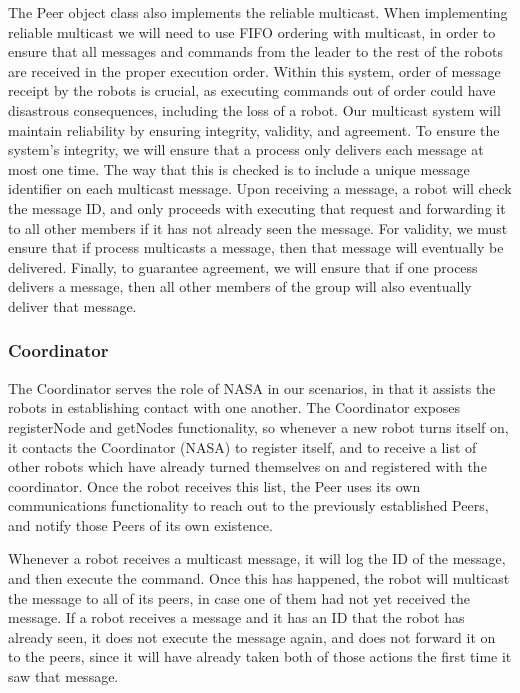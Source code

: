 \documentclass[10pt,letterpaper]{article}
\begin{document}
    The Peer object class also implements the reliable multicast. When implementing reliable multicast we will need to use FIFO ordering with multicast, in order to ensure that all messages and commands from the leader to the rest of the robots are received in the proper execution order. Within this system, order of message receipt by the robots is crucial, as executing commands out of order could have disastrous consequences, including the loss of a robot. Our multicast system will maintain reliability by ensuring integrity, validity, and agreement. To ensure the system's integrity, we will ensure that a process only delivers each message at most one time. The way that this is checked is to include a unique message identifier on each multicast message. Upon receiving a message, a robot will check the message ID, and only proceeds with executing that request and forwarding it to all other members if it has not already seen the message. For validity, we must ensure that if process multicasts a message, then that message will eventually be delivered. Finally, to guarantee agreement, we will ensure that if one process delivers a message, then all other members of the group will also eventually deliver that message.
    
    \subsubsection{Coordinator}
    The Coordinator serves the role of NASA in our scenarios, in that it assists the robots in establishing contact with one another. The Coordinator exposes registerNode and getNodes functionality, so whenever a new robot turns itself on, it contacts the Coordinator (NASA) to register itself, and to receive a list of other robots which have already turned themselves on and registered with the coordinator. Once the robot receives this list, the Peer uses its own communications functionality to reach out to the previously established Peers, and notify those Peers of its own existence.
    
    Whenever a robot receives a multicast message, it will log the ID of the message, and then execute the command. Once this has happened, the robot will multicast the message to all of its peers, in case one of them had not yet received the message. If a robot receives a message and it has an ID that the robot has already seen, it does not execute the message again, and does not forward it on to the peers, since it will have already taken both of those actions the first time it saw that message. 
    
\end{document}
